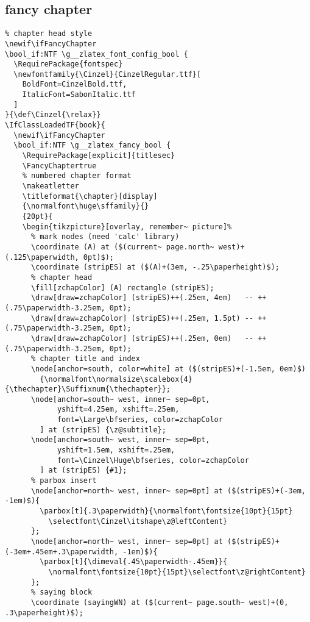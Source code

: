 \subsection{fancy chapter}
\begin{verbatim}
% chapter head style
\newif\ifFancyChapter
\bool_if:NTF \g__zlatex_font_config_bool {
  \RequirePackage{fontspec}
  \newfontfamily{\Cinzel}{CinzelRegular.ttf}[
    BoldFont=CinzelBold.ttf,
    ItalicFont=SabonItalic.ttf
  ]
}{\def\Cinzel{\relax}}
\IfClassLoadedTF{book}{
  \newif\ifFancyChapter
  \bool_if:NTF \g__zlatex_fancy_bool {
    \RequirePackage[explicit]{titlesec}
    \FancyChaptertrue
    % numbered chapter format
    \makeatletter
    \titleformat{\chapter}[display]
    {\normalfont\huge\sffamily}{}
    {20pt}{
    \begin{tikzpicture}[overlay, remember~ picture]%
      % mark nodes (need 'calc' library)
      \coordinate (A) at ($(current~ page.north~ west)+(.125\paperwidth, 0pt)$);
      \coordinate (stripES) at ($(A)+(3em, -.25\paperheight)$);
      % chapter head
      \fill[zchapColor] (A) rectangle (stripES);
      \draw[draw=zchapColor] (stripES)++(.25em, 4em)   -- ++(.75\paperwidth-3.25em, 0pt);
      \draw[draw=zchapColor] (stripES)++(.25em, 1.5pt) -- ++(.75\paperwidth-3.25em, 0pt);
      \draw[draw=zchapColor] (stripES)++(.25em, 0em)   -- ++(.75\paperwidth-3.25em, 0pt);
      % chapter title and index
      \node[anchor=south, color=white] at ($(stripES)+(-1.5em, 0em)$)
        {\normalfont\normalsize\scalebox{4}{\thechapter}\Suffixnum{\thechapter}};
      \node[anchor=south~ west, inner~ sep=0pt, 
            yshift=4.25em, xshift=.25em, 
            font=\Large\bfseries, color=zchapColor
        ] at (stripES) {\z@subtitle};
      \node[anchor=south~ west, inner~ sep=0pt,
            yshift=1.5em, xshift=.25em,
            font=\Cinzel\Huge\bfseries, color=zchapColor
        ] at (stripES) {#1};
      % parbox insert
      \node[anchor=north~ west, inner~ sep=0pt] at ($(stripES)+(-3em, -1em)$){
        \parbox[t]{.3\paperwidth}{\normalfont\fontsize{10pt}{15pt}
          \selectfont\Cinzel\itshape\z@leftContent}
      };
      \node[anchor=north~ west, inner~ sep=0pt] at ($(stripES)+(-3em+.45em+.3\paperwidth, -1em)$){
        \parbox[t]{\dimeval{.45\paperwidth-.45em}}{
          \normalfont\fontsize{10pt}{15pt}\selectfont\z@rightContent}
      };
      % saying block
      \coordinate (sayingWN) at ($(current~ page.south~ west)+(0, .3\paperheight)$); 

\end{verbatim}
